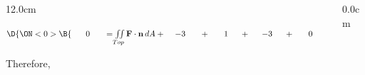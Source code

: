 \begin{frame}
\begin{columns}
\begin{column}{12.0cm}
%

\vspace{0.4cm}

$\D{
\ON<0>{\B{\hspace{0.6cm} 0 \hspace{0.6cm} = \iint \limits_{Top} {\bf F} \cdot {\bf n}\, dA + \hspace{0.4cm} -3 \hspace{0.6cm} + \hspace{0.6cm} 1 \hspace{0.5cm} + \hspace{0.5cm} -3 \hspace{0.5cm} + \hspace{0.6cm} 0 \hspace{0.6cm} + \hspace{0.6cm} 0 }}}$

\vspace{0.2cm}

Therefore, 

\end{column}\begin{column}{0.0cm}\end{column}\end{columns}
\end{frame}
